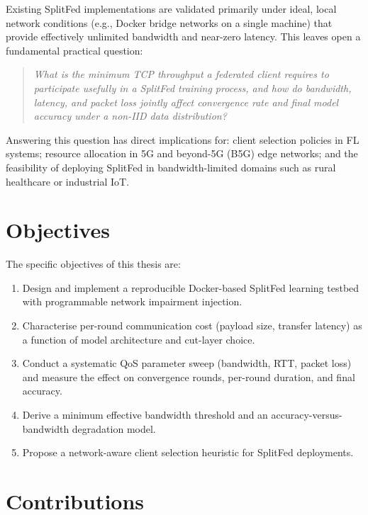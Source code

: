 \documentclass[12pt,a4paper]{report}
\begin{document}
Existing SplitFed implementations are validated primarily under ideal, local network conditions (e.g., Docker bridge networks on a single machine) that provide effectively unlimited bandwidth and near-zero latency. This leaves open a fundamental practical question:

\begin{quote}
\emph{What is the minimum TCP throughput a federated client requires to participate usefully in a SplitFed training process, and how do bandwidth, latency, and packet loss jointly affect convergence rate and final model accuracy under a non-IID data distribution?}
\end{quote}

Answering this question has direct implications for: client selection policies in FL systems; resource allocation in 5G and beyond-5G (B5G) edge networks; and the feasibility of deploying SplitFed in bandwidth-limited domains such as rural healthcare or industrial IoT.

\section{Objectives}

The specific objectives of this thesis are:
\begin{enumerate}[label=\textbf{O\arabic*.}]
  \item Design and implement a reproducible Docker-based SplitFed learning testbed with programmable network impairment injection.
  \item Characterise per-round communication cost (payload size, transfer latency) as a function of model architecture and cut-layer choice.
  \item Conduct a systematic QoS parameter sweep (bandwidth, RTT, packet loss) and measure the effect on convergence rounds, per-round duration, and final accuracy.
  \item Derive a minimum effective bandwidth threshold and an accuracy-versus-bandwidth degradation model.
  \item Propose a network-aware client selection heuristic for SplitFed deployments.
\end{enumerate}

\section{Contributions}
\end{document}
